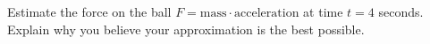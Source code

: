 \documentclass[12pt]{article}
\begin{document}
Estimate the force on the ball $F = \text{mass} \cdot \text{acceleration}$
at time $t = 4$ seconds. Explain why you believe your approximation
is the best possible.


\end{document}
